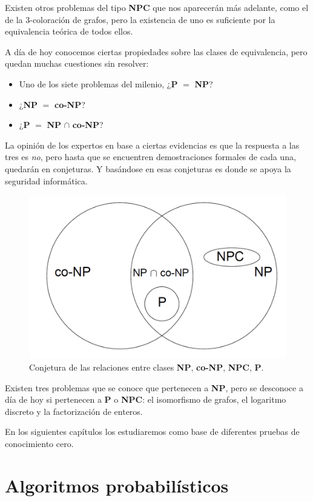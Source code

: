 \hfil

Existen otros problemas del tipo \textbf{NPC} que nos aparecer\'an m\'as adelante,
como el de la 3-coloraci\'on de grafos, pero la existencia de uno es suficiente
por la equivalencia te\'orica de todos ellos.

A día de hoy conocemos ciertas propiedades sobre las clases de equivalencia, pero
quedan muchas cuestiones sin resolver:

\begin{itemize}
	\item Uno de los siete problemas del milenio, ¿\textbf{P} $=$ \textbf{NP}?
	\item ¿\textbf{NP} $=$ \textbf{co-NP}?
	\item ¿\textbf{P} $=$ \textbf{NP} $\cap$ \textbf{co-NP}?
\end{itemize}


La opinión de los expertos en base a ciertas evidencias es que la respuesta a
las tres es \textit{no}, pero hasta que se encuentren demostraciones formales
de cada una, quedarán en conjeturas. Y basándose en esas conjeturas es donde
se apoya la seguridad informática.


\begin{figure}[bth]
	\begin{center}
		\includegraphics[width=.45\linewidth]{gfx/NPclasses}
	\end{center}
	\caption{Conjetura de las relaciones entre clases \textbf{NP}, \textbf{co-NP},
	\textbf{NPC}, \textbf{P}.}
	\label{fig:NPclasses}
\end{figure}


Existen tres problemas que se conoce que pertenecen a \textbf{NP}, pero se
desconoce a día de hoy si pertenecen a \textbf{P} o \textbf{NPC}: el
isomorfismo de grafos, el logaritmo discreto y la factorización de enteros.

En los siguientes capítulos los estudiaremos como base de diferentes pruebas
de conocimiento cero.

\hfil


\section{Algoritmos probabilísticos}

